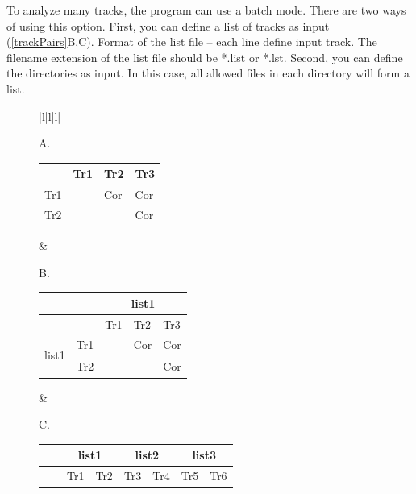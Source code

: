 \documentclass{article}
\newcommand{\tw}{\textwidth}
\begin{document}
To analyze many tracks, the program can use a batch mode.  
There are two ways of using this option. First, you can define a list of tracks as input (\ref{trackPairs}B,C). Format of the list file -- each line define input track. The filename extension of the list file should be *.list or *.lst. 
Second, you can define the directories as input. In this case, all allowed files in each directory will form a list.

\begin{figure}[!h]
\newcommand{\cor}{Cor}
\begin{tabular}{|l|l|l|}
\begin{minipage}{0.22\tw}

\begin{center}
A. 
\end{center}

\begin{tabular}{llll}\hline
&Tr1&Tr2&Tr3\\\hline
Tr1  &\cellcolor{gray}&\cor &\cor \\
Tr2  &\cellcolor{gray}& \cellcolor{gray} &\cor \\
\end{tabular}
\end{minipage}&
\begin{minipage}{0.27\tw}
\begin{center}
B.
\end{center}

\begin{tabular}{ll|lll}
&& \multicolumn{3}{c}{list1} \\\hline
&& Tr1&Tr2&Tr3\\\hline
\multirow{2}{*}{\begin{sideways} list1 \end{sideways}}&Tr1&\cellcolor{gray}&\cor &\cor\\
&Tr2&\cellcolor{gray}&\cellcolor{gray}&\cor\\
\end{tabular}
\end{minipage}&
\begin{minipage}{0.42\tw}
\begin{center}
C.
\end{center}
\begin{tabular}{ll|ll|ll|ll}
&& \multicolumn{2}{c|}{list1}& \multicolumn{2}{c|}{list2}& \multicolumn{2}{c}{list3} \\\hline
&& Tr1&Tr2&Tr3&Tr4&Tr5&Tr6\\\hline


\end{tabular}
\end{minipage}
\end{tabular}
\end{figure}
\end{document}
